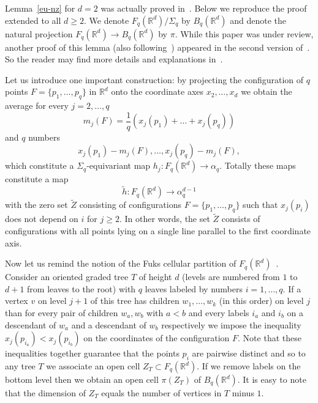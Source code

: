 \documentclass[12pt,a4paper,oneside]{amsart}
\theoremstyle{definition}
\theoremstyle{remark}
\numberwithin{equation}{section}
\newcommand{\Sg}{\Sigma}
\begin{document}
Lemma~\ref{eu-nz} for $d=2$ was actually proved in~\cite{vass1988}. Below we reproduce the proof extended to all $d\ge 2$. We denote $F_q(\mathbb R^d)/\Sg_q$ by $B_q(\mathbb R^d)$ and denote the natural projection $F_q(\mathbb R^d)\to B_q(\mathbb R^d)$ by $\pi$. While this paper was under review, another proof of this lemma (also following~\cite{vass1988}) appeared in the second version of~\cite{arhu2010}. So the reader may find more details and explanations  in~\cite{arhu2010}.

Let us introduce one important construction: by projecting the configuration of $q$ points $F=\{p_1, \ldots, p_q\}$ in $\mathbb R^d$ onto the coordinate axes $x_2, \ldots, x_d$ we obtain the average for every $j=2,\ldots, q$
\begin{equation}
\label{proj-av}
m_j(F) = \frac{1}{q}(x_j(p_1) + \dots + x_j(p_q))
\end{equation}
and $q$ numbers
\begin{equation}
\label{proj-dev}
x_j(p_1) - m_j(F), \ldots, x_j(p_q) - m_j(F),
\end{equation}
which constitute a $\Sg_q$-equivariant map $h_j : F_q(\mathbb R^d)\to \alpha_q$. Totally these maps constitute a map
\begin{equation}
\label{test-map}
\tilde h : F_q(\mathbb R^d) \to \alpha_q^{d-1}
\end{equation}
with the zero set $\tilde Z$ consisting of configurations $F=\{p_1, \ldots, p_q\}$ such that $x_j(p_i)$ does not depend on $i$ for $j \ge 2$. In other words, the set $\tilde Z$ consists of configurations with all points lying on a single line parallel to the first coordinate axis.

Now let us remind the notion of the Fuks cellular partition of $F_q(\mathbb R^d)$~\cite{fuks1970}. Consider an oriented graded tree $T$ of height $d$ (levels are numbered from $1$ to $d+1$ from leaves to the root) with $q$ leaves labeled by numbers $i=1,\ldots, q$. If a vertex $v$ on level $j+1$ of this tree has children $w_1, \ldots, w_k$ (in this order) on level $j$ than for every pair of children $w_a, w_b$ with $a<b$ and every labels $i_a$ and $i_b$ on a descendant of $w_a$ and a descendant of $w_b$ respectively we impose the inequality $x_j(p_{i_a}) <x_j(p_{i_b})$ on the coordinates of the configuration $F$. Note that these inequalities together guarantee that the points $p_i$ are pairwise distinct and so to any tree $T$ we associate an open cell $Z_T\subset F_q(\mathbb R^d)$. If we remove labels on the bottom level then we obtain an open cell $\pi(Z_T)$ of $B_q(\mathbb R^d)$. It is easy to note that the dimension of $Z_T$ equals the number of vertices in $T$ minus $1$.
\end{document}
